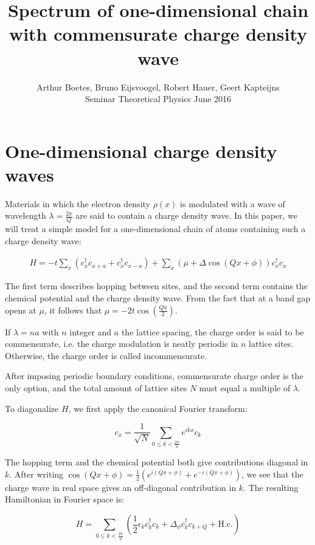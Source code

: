 \documentclass[letterpaper, 10 pt, conference]{ieeeconf}  %
\title{\LARGE \bf
  Spectrum of one-dimensional chain with commensurate charge density wave
}
\author{Arthur Boetes, Bruno Eijsvoogel, Robert Hauer, Geert Kapteijns\\
Seminar Theoretical Physics
June 2016
}
\begin{document}
\maketitle
\thispagestyle{empty}
\pagestyle{empty}


\section{One-dimensional charge density waves}

Materials in which the electron density $\rho(x)$ is modulated with a wave of
wavelength $\lambda = \frac{2\pi}{Q}$ are said to contain a charge density wave.
In this paper, we will treat a simple model for a one-dimensional chain of atoms containing such a charge density wave:

\begin{align}
H = -t \sum_x (c_x^{\dagger}c_{x+a} + c_x^{\dagger}c_{x-a}) + \sum_x (\mu + \Delta \cos(Qx + \phi))c_x^{\dagger}c_x
\end{align}

The first term describes hopping between sites, and the second term contains the chemical potential and the charge density wave. From the fact that at a band gap opens at $\mu$, it follows that $\mu = -2t\cos(\frac{Qa}{2})$.

If $\lambda = n a$ with $n$ integer and $a$ the lattice spacing, the charge order is said to be commensurate, i.e. the charge modulation is neatly periodic in $n$ lattice sites. Otherwise, the charge order is called incommensurate.

After imposing periodic boundary conditions, commensurate charge order is the only option, and the total amount of lattice sites $N$ must equal a multiple of $\lambda$.

To diagonalize $H$, we first apply the canonical Fourier transform:

$$c_x = \frac{1}{\sqrt{N}}\sum_{0 \leq k < \frac{2\pi}{a}}e^{ikx}c_k$$

The hopping term and the chemical potential both give contributions diagonal in $k$. After writing $\cos(Qx + \phi) = \frac{1}{2}(e^{i(Qx + \phi)} + e^{-i(Qx + \phi)}) $, we see that the charge wave in real space gives an off-diagonal contribution in $k$. The resulting Hamiltonian in Fourier space is:

$$ H = \sum_{0 \leq k < \frac{2\pi}{a}} (\frac{1}{2}\epsilon_k c_k^{\dagger}c_k + \Delta_\phi c_k^{\dagger}c_{k+Q} + \text{H.c.}) $$
\end{document}
